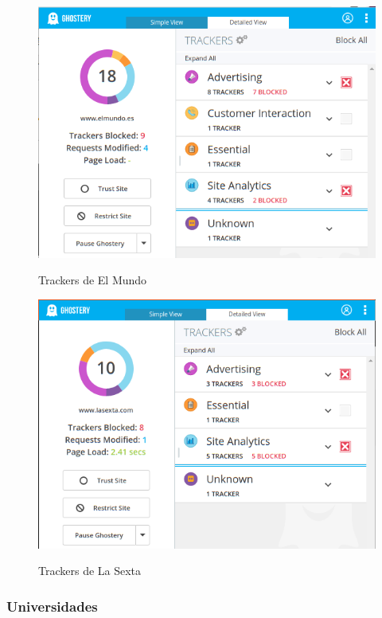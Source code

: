 \documentclass[10pt,a4paper]{article}
\begin{document}
\begin{figure}[H]
  \centering
  \includegraphics[scale=0.6]{ghost_elmundo.png}\\
  \caption{Trackers de El Mundo}
  \label{fig:object}
\end{figure}

\begin{figure}[H]
  \centering
  \includegraphics[scale=0.6]{ghost_la_sexta.png}\\
  \caption{Trackers de La Sexta}
  \label{fig:object}
\end{figure}

\subsubsection*{Universidades}
\end{document}
